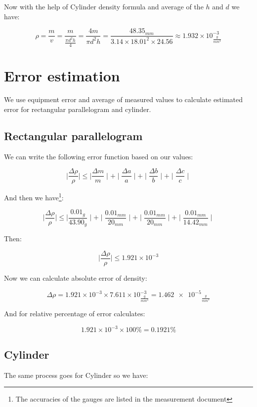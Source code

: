 \documentclass[a4paper, 12pt]{article}
\begin{document}
Now with the help of Cylinder density formula and average of the \(h\) and \(d\) we have:

\[
\rho = \frac{m}{v} = \frac{m}{ \frac{\pi d^{2} h}{4}} = \frac{4m}{\pi d^{2} h} = \frac{48.35_{mm}}{3.14 \times 18.01^{2} \times 24.56} \approx 1.932\times10^{-3}_{\frac{g}{mm^{3}}}
\]

\section{Error estimation}

We use equipment error and average of measured values to calculate estimated error for rectangular parallelogram and cylinder.

\subsection{Rectangular parallelogram }

We can write the following error function based on our values:

\[
\mid\frac{\varDelta\rho}{\rho}\mid \leqslant \mid\frac{\varDelta m}{m}\mid + \mid\frac{\varDelta a}{a}\mid + \mid\frac{\varDelta b}{b}\mid + \mid\frac{\varDelta c}{c}\mid
\]

And then we have\footnote{The accuracies of the gauges are listed in the measurement document}:

\[
\mid\frac{\varDelta\rho}{\rho}\mid \leqslant \mid\frac{0.01_{g}}{43.90_{g}}\mid + \mid\frac{0.01_{mm}}{20_{mm}}\mid + \mid\frac{0.01_{mm}}{20_{mm}}\mid + \mid\frac{0.01_{mm}}{14.42_{mm}}\mid
\]

\clearpage

Then: 

\[
\mid\frac{\varDelta\rho}{\rho}\mid \leqslant 1.921\times10^{-3}
\]

Now we can calculate absolute error of density:

\[
\varDelta \rho = 1.921\times10^{-3} \times 7.611\times10^{-3}_{\frac{g}{mm^{3}}} = \num{1.462e-5}_{\frac{g}{mm^{3}}}
\]

And for relative percentage of error calculates: 

\[
 1.921\times10^{-3} \times 100\% = 0.1921\% 
\]

\subsection{Cylinder}

The same process goes for Cylinder so we have:
\end{document}
